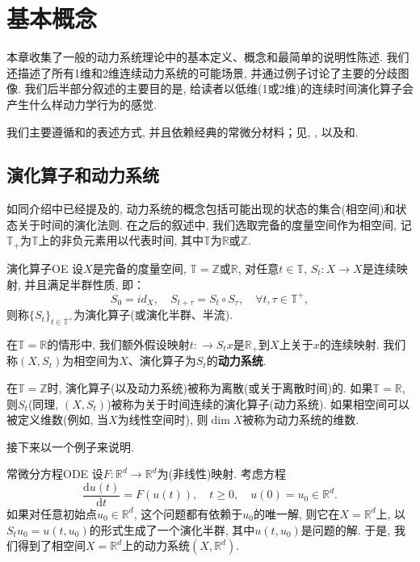 \chapter{基本概念}\label{cpt:1}

本章收集了一般的动力系统理论中的基本定义、概念和最简单的说明性陈述. 我们还描述了所有1维和2维连续动力系统的可能场景, 并通过例子讨论了主要的分歧图像. 我们后半部分叙述的主要目的是, 给读者以低维(1或2维)的连续时间演化算子会产生什么样动力学行为的感觉.

我们主要遵循\cite{Nemytskii60}和\cite{Sibirsky75}的表述方式, 并且依赖经典的常微分材料；见\cite{Coddington55}, \cite{Hartman02}, \cite{Lefschetz77}以及\cite{Bautin90}和\cite{Reissing74}.

\section{演化算子和动力系统}
如同介绍中已经提及的, 动力系统的概念包括可能出现的状态的集合(相空间)和状态关于时间的演化法则. 在之后的叙述中, 我们选取完备的度量空间作为相空间, 记$\mathbb{T}_{+}$为$\mathbb{T}$上的非负元素用以代表时间, 其中$\mathbb{T}$为$\mathbb{R}$或$\mathbb{Z}$.

\begin{defination}{演化算子}{OE}
	设$X$是完备的度量空间, $\mathbb{T}=\mathbb{Z}$或$\mathbb{R}$, 对任意$t\in\mathbb{T}$, $S_{t}:X\to X$是连续映射, 并且满足半群性质, 即：$$S_{0}=id_{X},\quad S_{t+\tau}=S_{t}\circ S_{\tau},\quad\forall t,\tau\in\mathbb{T}^{+},$$则称$\{S_{t}\}_{t\in \mathbb{T}^{+}}$为演化算子(或演化半群、半流). 
\end{defination}

在$\mathbb{T}=\mathbb{R}$的情形中, 我们额外假设映射$t:\to S_{t}x$是$\mathbb{R}_{+}$到$X$上关于$x$的连续映射.  我们称$(X,S_{t})$为相空间为$X$、演化算子为$S_{t}$的\textbf{动力系统}. 

在$\mathbb{T}=\mathbb{Z}$时, 演化算子(以及动力系统)被称为离散(或关于离散时间)的.  如果$\mathbb{T}=\mathbb{R}$, 则$S_{t}$(同理, $(X,S_{t})$)被称为关于时间连续的演化算子(动力系统). 如果相空间可以被定义维数(例如, 当$X$为线性空间时), 则$\dim X$被称为动力系统的维数. 

接下来以一个例子来说明. 

\begin{example}{常微分方程}{ODE}
	设$F:\mathbb{R}^{d}\to\mathbb{R}^{d}$为(非线性)映射. 考虑方程
	\begin{equation}\label{equ:exa1}
		\frac{\mathrm{d}u(t)}{\mathrm{d}t}=F(u(t)),\quad t\geqslant 0,\quad u(0)=u_{0}\in\mathbb{R}^{d}.
	\end{equation}
	如果对任意初始点$u_{0}\in\mathbb{R}^{d}$, 这个问题都有依赖于$u_{0}$的唯一解, 则它在$X=\mathbb{R}^{d}$上, 以$S_{t}u_{0}=u(t,u_{0})$的形式生成了一个演化半群, 其中$u(t,u_{0})$是问题的解. 于是, 我们得到了相空间$X=\mathbb{R}^{d}$上的动力系统$(X,\mathbb{R}^{d})$. 
\end{example}

